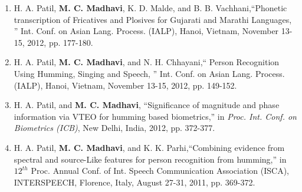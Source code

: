 \documentclass[10pt]{article}
\begin{document}
\begin{enumerate}[resume]
\item  H. A. Patil, \textbf{M. C. Madhavi}, K. D. Malde, and B. B. Vachhani,``Phonetic transcription of Fricatives and Plosives for Gujarati and Marathi Languages, '' Int. Conf. on Asian Lang. Process. (IALP), Hanoi, Vietnam,  November 13-15, 2012, pp. 177-180. 
\item  H. A. Patil, \textbf{M. C. Madhavi}, and N. H. Chhayani,``
Person Recognition Using Humming, Singing and Speech, '' Int. Conf. on Asian Lang. Process. (IALP), Hanoi, Vietnam,  November 13-15, 2012, pp. 149-152. 
\item H. A. Patil, and \textbf{M. C. Madhavi}, ``Significance of magnitude and phase information via VTEO for humming based biometrics,'' in
\textit{Proc. Int. Conf. on Biometrics (ICB)}, New Delhi, India, 2012, pp. 372-377.

\item H. A. Patil, \textbf{M. C. Madhavi}, and K. K. Parhi,``Combining evidence from spectral and source-Like features for person recognition from humming,'' in $ 12^{th} $ Proc. Annual  Conf. of Int. Speech Communication Association (ISCA), INTERSPEECH,  Florence, Italy, August 27-31, 2011, pp. 369-372. 
\end{enumerate}
\end{document}

